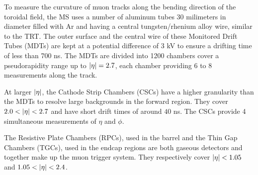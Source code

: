 To measure the curvature of muon tracks along the bending direction of the toroidal field, the MS uses a number of aluminum tubes 30 milimeters in diameter filled with Ar and having a central tungsten/rhenium alloy wire, similar to the TRT. 
The outer surface and the central wire of these Monitored Drift Tubes (MDTs) are kept at a potential difference of 3 kV to ensure a drifting time of less than 700 ns. 
The MDTs are divided into 1200 chambers cover a pseudorapidity range up to $\abs{\eta} =2.7$, each chamber providing 6 to 8 measurements along the track.

At larger $\abs{\eta}$, the Cathode Strip Chambers (CSCs) have a higher granularity than the MDTs to resolve large backgrounds in the forward region. 
They cover $2.0< \abs{\eta} < 2.7$ and have short drift times of around $40$ ns. 
The CSCs provide 4 simultaneous measurements of $\eta$ and $\phi$.

The Resistive Plate Chambers (RPCs), used in the barrel and the Thin Gap Chambers (TGCs), used in the endcap regions are both gaseous detectors and together make up the muon trigger system. 
They respectively cover $\abs{\eta} < 1.05$ and $1.05 < \abs{\eta} < 2.4$.



